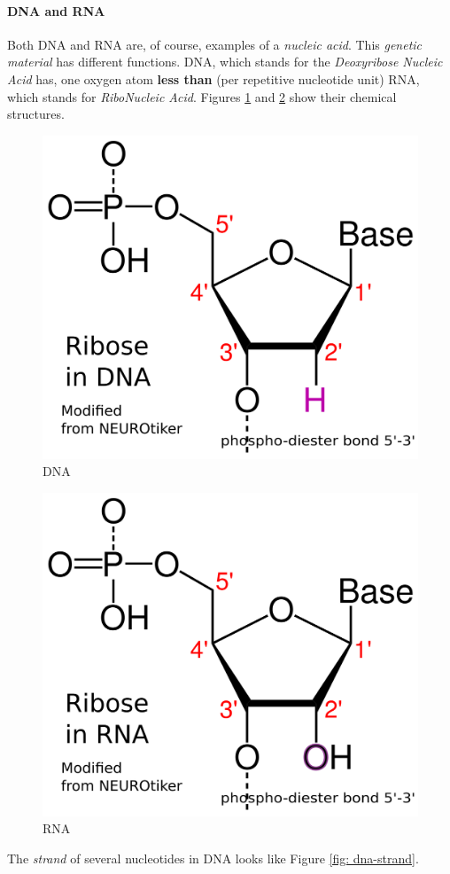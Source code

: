 \paragraph{DNA and RNA}
Both DNA and RNA are, of course, examples of a \emph{nucleic acid}. This \emph{genetic material} has different functions. DNA, which stands for the \emph{Deoxyribose Nucleic Acid} has, one oxygen atom \textbf{less than} (per repetitive nucleotide unit) RNA, which stands for \emph{RiboNucleic Acid}. Figures \ref{fig: dna} and \ref{fig: rna} show their chemical structures.

\begin{figure}[ht!]
    \centering
    \includegraphics[width=0.5\linewidth]{dna-ribose-numbering-std-notation.png}
    \caption{DNA}
    \label{fig: dna}
\end{figure}

\begin{figure}[ht!]
    \centering
    \includegraphics[width=0.5\linewidth]{rna-ribose-numbering-std-notation.png}
    \caption{RNA}
    \label{fig: rna}
\end{figure}

The \emph{strand} of several nucleotides in DNA looks like Figure \ref{fig: dna-strand}.

